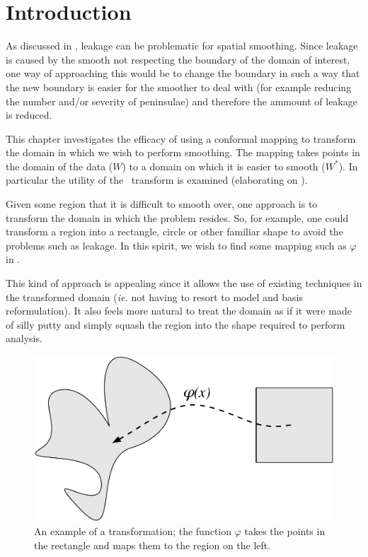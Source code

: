 \label{chap-sc}
\section{Introduction}

As discussed in , leakage can be problematic for spatial smoothing. Since leakage is caused by the smooth not respecting the boundary of the domain of interest, one way of approaching this would be to change the boundary in such a way that the new boundary is easier for the smoother to deal with (for example reducing the number and/or severity of peninsulae) and therefore the ammount of leakage is reduced.

This chapter investigates the efficacy of using a conformal mapping to transform the domain in which we wish to perform smoothing. The mapping takes points in the domain of the data ($W$) to a domain on which it is easier to smooth ($W^*$). In particular the utility of the \sch\ transform is examined (elaborating on \cite{eilerstalk}).

Given some region that it is difficult to smooth over, one approach is to transform the domain in which the problem resides. So, for example, one could transform a region into a rectangle, circle or other familiar shape to avoid the problems such as leakage. In this spirit, we wish to find some mapping such as $\varphi$ in .

This kind of approach is appealing since it allows the use of existing techniques in the transformed domain (\emph{ie.} not having to resort to model and basis reformulation). It also feels more natural to treat the domain as if it were made of silly putty and simply squash the region into the shape required to perform analysis.

\begin{figure} [htbp]
\centering
\includegraphics[scale=0.3]{sc/figs/simpledia.pdf}
\caption{An example of a transformation; the function $\varphi$ takes the points in the rectangle and maps them to the region on the left.}
\label{simpledia}
\end{figure}

